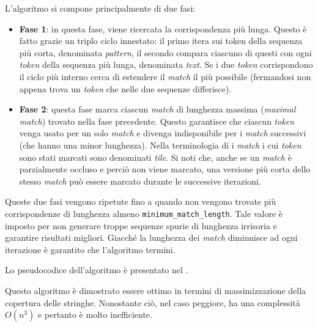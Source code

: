L'algoritmo si compone principalmente di due fasi:
\begin{itemize}
	\item \textbf{Fase 1}: in questa fase, viene ricercata la corrispondenza più lunga. Questo è fatto grazie un triplo ciclo innestato: il primo itera sui token della sequenza più corta, denominata \textit{pattern}, il secondo compara ciascuno di questi con ogni \textit{token} della sequenza più lunga, denominata \textit{text}. Se i due \textit{token} corrispondono il ciclo più interno cerca di estendere il \textit{match} il più possibile (fermandosi non appena trova un \textit{token} che nelle due sequenze differisce).

	\item \textbf{Fase 2}: questa fase marca ciascun \textit{match} di lunghezza massima (\textit{maximal match}) trovato nella fase precedente. Questo garantisce che ciascun \textit{token} venga usato per un solo \textit{match} e divenga indisponibile per i \textit{match} successivi (che hanno una minor lunghezza). Nella terminologia di \cite{wise-running-93} i \textit{match} i cui \textit{token} sono stati marcati sono denominati \textit{tile}. Si noti che, anche se un \textit{match} è parzialmente occluso e perciò non viene marcato, una versione più corta dello stesso \textit{match} può essere marcato durante le successive iterazioni.
\end{itemize}

Queste due fasi vengono ripetute fino a quando non vengono trovate più corrispondenze di lunghezza almeno \texttt{minimum\_match\_length}.
%
Tale valore è imposto per non generare troppe sequenze spurie di lunghezza irrisoria e garantire risultati migliori.
%
Giacché la lunghezza dei \textit{match} diminuisce ad ogni iterazione è garantito che l'algoritmo termini.

Lo pseudocodice dell'algoritmo è presentato nel .



Questo algoritmo è dimostrato \cite{wise-running-93} essere ottimo in termini di massimizzazione della copertura delle stringhe.
%
Nonostante ciò, nel caso peggiore, ha una complessità $O(n^3)$ e pertanto è molto inefficiente.

